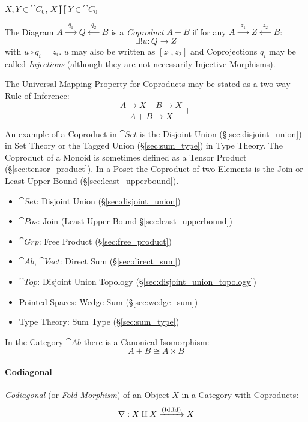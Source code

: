 $X,Y \in \cat{C}_0$, $X \amalg Y \in \cat{C}_0$

The Diagram $A \xrightarrow{\;\;q_1\;\;} Q \xleftarrow{\;\;q_2\;\;} B$
is a \emph{Coproduct} $A + B$ if for any $A \xrightarrow{\;\;z_1\;\;}
Z \xleftarrow{\;\;z_2\;\;} B$:
\[
  \exists!u : Q \rightarrow Z
\]
with $u \circ q_i = z_i$. $u$ may also be written as $[ z_1, z_2 ]$
and Coprojections $q_i$ may be called \emph{Injections} (although they
are not necessarily Injective Morphisms).

The Universal Mapping Property for Coproducts may be stated as a
two-way Rule of Inference:
\[
  {
    \frac{A \rightarrow X \;\;\;\; B \rightarrow X}
    {A + B \rightarrow X}
  }+
\]

An example of a Coproduct in $\cat{Set}$ is the Disjoint Union
(\S\ref{sec:disjoint_union}) in Set Theory or the Tagged Union
(\S\ref{sec:sum_type}) in Type Theory. The Coproduct of a Monoid is
sometimes defined as a Tensor Product (\S\ref{sec:tensor_product}). In
a Poset the Coproduct of two Elements is the Join or Least Upper Bound
(\S\ref{sec:least_upperbound}).

\begin{itemize}
\item $\cat{Set}$: Disjoint Union (\S\ref{sec:disjoint_union})
\item $\cat{Pos}$: Join (Least Upper Bound
  \S\ref{sec:least_upperbound})
\item $\cat{Grp}$: Free Product (\S\ref{sec:free_product})
\item $\cat{Ab}$, $\cat{Vect}$: Direct Sum (\S\ref{sec:direct_sum})
\item $\cat{Top}$: Disjoint Union Topology
  (\S\ref{sec:disjoint_union_topology})
\item Pointed Spaces: Wedge Sum (\S\ref{sec:wedge_sum})
\item Type Theory: Sum Type (\S\ref{sec:sum_type})
\end{itemize}

In the Category $\cat{Ab}$ there is a Canonical
Isomorphism:\cite{awodey06}
\[
  A + B \cong A \times B
\]



\paragraph{Codiagonal}\label{sec:codiagonal}\hfill

\emph{Codiagonal} (or \emph{Fold Morphism}) of an Object $X$ in a
Category with Coproducts:
\[
  \nabla : X \amalg X \xrightarrow{(\mathrm{Id},\mathrm{Id})} X
\]

